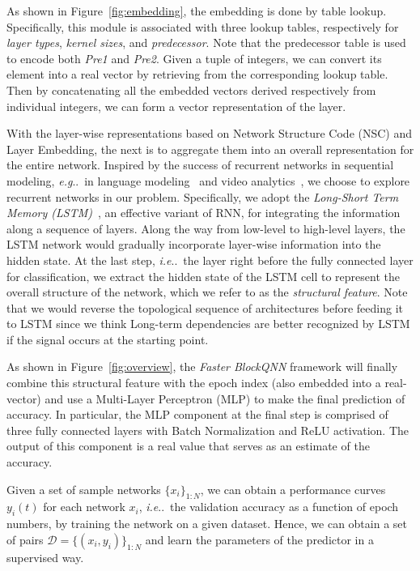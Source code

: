 \documentclass[10pt,journal,compsoc]{IEEEtran}
\makeatletter
\DeclareRobustCommand\onedot{\futurelet\@let@token\@onedot}
\def\@onedot{\ifx\@let@token.\else.\null\fi\xspace}
\def\eg{\emph{e.g}\onedot} \def\Eg{\emph{E.g}\onedot}
\def\ie{\emph{i.e}\onedot} \def\Ie{\emph{I.e}\onedot}
\makeatother
\begin{document}
As shown in Figure~\ref{fig:embedding}, the embedding is done by table
lookup. Specifically, this module is associated with three lookup tables,
respectively for \emph{layer types}, \emph{kernel sizes}, and
\emph{predecessor}. Note that the predecessor table is used to encode
both \emph{Pre1} and \emph{Pre2}.
Given a tuple of integers, we can convert its element into a real vector
by retrieving from the corresponding lookup table.
Then by concatenating all the embedded vectors derived respectively
from individual integers, we can form a vector representation of the layer.


With the layer-wise representations based on Network Structure Code (NSC) and Layer
Embedding, the next is to aggregate them into an overall representation
for the entire network.
Inspired by the success of recurrent networks in sequential modeling,
\eg~in language modeling~\cite{mikolov2010recurrent} and video analytics~\cite{yue2015beyond},
we choose to explore recurrent networks in our problem.
Specifically, we adopt the \emph{Long-Short Term Memory (LSTM)}~\cite{hochreiter1997long},
an effective variant of RNN, for integrating the information along
a sequence of layers.
Along the way from low-level to high-level layers, the LSTM network
would gradually incorporate layer-wise information into the hidden state.
At the last step, \ie~the layer right before the fully connected layer
for classification, we extract the hidden state of the LSTM cell to represent
the overall structure of the network, which we refer to as the
\emph{structural feature}. 
Note that we would reverse the topological sequence of architectures before feeding it to LSTM since we think Long-term dependencies are better recognized by LSTM if the signal occurs at the starting point.

As shown in Figure~\ref{fig:overview}, the \emph{Faster BlockQNN} framework will
finally combine this structural feature with the epoch index (also embedded
into a real-vector) and use a Multi-Layer Perceptron (MLP) to make the final
prediction of accuracy.
In particular, the MLP component at the final step is comprised of
three fully connected layers with Batch Normalization and ReLU activation.
The output of this component is a real value that serves as an estimate
of the accuracy.



Given a set of sample networks $\{x_i\}_{1:N}$,
we can obtain a performance curves $y_i(t)$ for each network $x_i$,
\ie~the validation accuracy as a function of epoch numbers,
by training the network on a given dataset.
Hence, we can obtain a set of pairs $\mathcal{D} = \{(x_i, y_i)\}_{1:N}$
and learn the parameters of the predictor in a supervised way.
\end{document}
